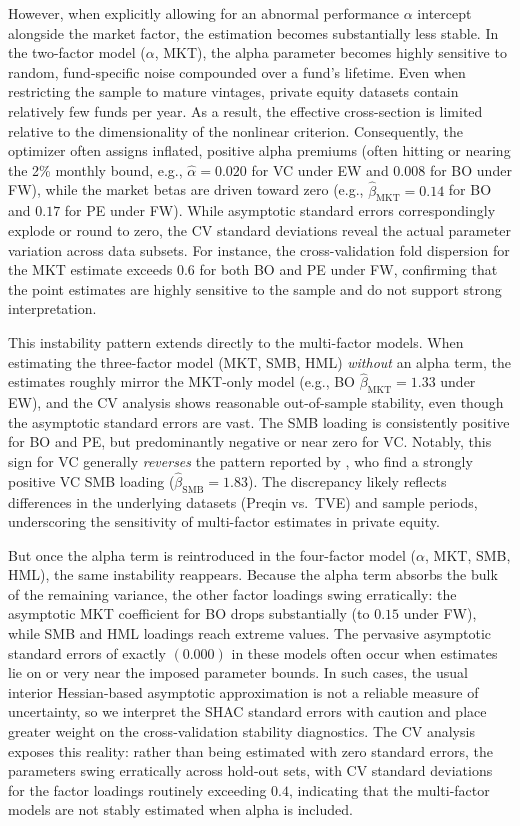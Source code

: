 However, when explicitly allowing for an abnormal performance $\alpha$ intercept alongside the market factor, the estimation becomes substantially less stable.
In the two-factor model ($\alpha$, MKT), the alpha parameter becomes highly sensitive to random, fund-specific noise compounded over a fund's lifetime.
Even when restricting the sample to mature vintages, private equity datasets contain relatively few funds per year. 
As a result, the effective cross-section is limited relative to the dimensionality of the nonlinear criterion.
Consequently, the optimizer often assigns inflated, positive alpha premiums (often hitting or nearing the 2\% monthly bound, e.g., $\hat{\alpha} = 0.020$ for VC under EW and $0.008$ for BO under FW), while the market betas are driven toward zero (e.g., $\hat{\beta}_{\mathrm{MKT}} = 0.14$ for BO and $0.17$ for PE under FW).
While asymptotic standard errors correspondingly explode or round to zero, the CV standard deviations reveal the actual parameter variation across data subsets. 
For instance, the cross-validation fold dispersion for the MKT estimate exceeds $0.6$ for both BO and PE under FW, confirming that the point estimates are highly sensitive to the sample and do not support strong interpretation.

This instability pattern extends directly to the multi-factor models.
When estimating the three-factor model (MKT, SMB, HML) \emph{without} an alpha term, the estimates roughly mirror the MKT-only model (e.g., BO $\hat{\beta}_{\mathrm{MKT}} = 1.33$ under EW), and the CV analysis shows reasonable out-of-sample stability, even though the asymptotic standard errors are vast.
The SMB loading is consistently positive for BO and PE, but predominantly negative or near zero for VC. 
Notably, this sign for VC generally \emph{reverses} the pattern reported by \cite{DLP12}, who find a strongly positive VC SMB loading ($\hat{\beta}_{\mathrm{SMB}}=1.83$). 
The discrepancy likely reflects differences in the underlying datasets (Preqin vs.\ TVE) and sample periods, underscoring the sensitivity of multi-factor estimates in private equity.

But once the alpha term is reintroduced in the four-factor model ($\alpha$, MKT, SMB, HML), the same instability reappears.
Because the alpha term absorbs the bulk of the remaining variance, the other factor loadings swing erratically: the asymptotic MKT coefficient for BO drops substantially (to $0.15$ under FW), while SMB and HML loadings reach extreme values.
The pervasive asymptotic standard errors of exactly $(0.000)$ in these models often occur when estimates lie on or very near the imposed parameter bounds.
In such cases, the usual interior Hessian-based asymptotic approximation is not a reliable measure of uncertainty, so we interpret the SHAC standard errors with caution and place greater weight on the cross-validation stability diagnostics.
The CV analysis exposes this reality: rather than being estimated with zero standard errors, the parameters swing erratically across hold-out sets, with CV standard deviations for the factor loadings routinely exceeding $0.4$, indicating that the multi-factor models are not stably estimated when alpha is included.

